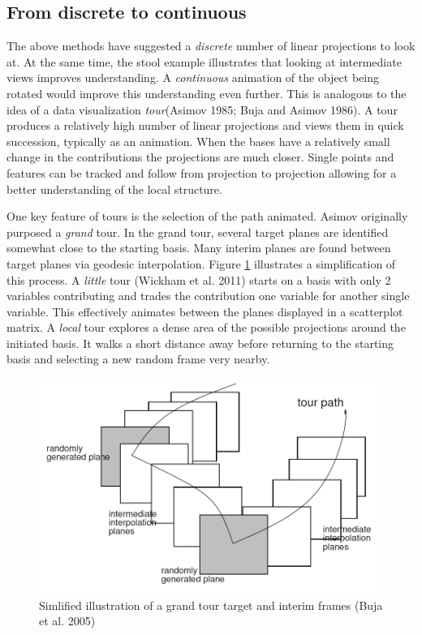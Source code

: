 \documentclass[11,]{article}
\begin{document}
\hypertarget{from-discrete-to-continuous}{%
\subsection{From discrete to continuous}\label{from-discrete-to-continuous}}

The above methods have suggested a \emph{discrete} number of linear projections to look at. At the same time, the stool example illustrates that looking at intermediate views improves understanding. A \emph{continuous} animation of the object being rotated would improve this understanding even further. This is analogous to the idea of a data visualization \emph{tour}(Asimov 1985; Buja and Asimov 1986). A tour produces a relatively high number of linear projections and views them in quick succession, typically as an animation. When the bases have a relatively small change in the contributions the projections are much closer. Single points and features can be tracked and follow from projection to projection allowing for a better understanding of the local structure.

One key feature of tours is the selection of the path animated.
Asimov originally purposed a \emph{grand} tour. In the grand tour, several target planes are identified somewhat close to the starting basis. Many interim planes are found between target planes via geodesic interpolation. Figure \ref{fig:grandFrames} illustrates a simplification of this process. A \emph{little} tour (Wickham et al. 2011) starts on a basis with only 2 variables contributing and trades the contribution one variable for another single variable. This effectively animates between the planes displayed in a scatterplot matrix. A \emph{local} tour explores a dense area of the possible projections around the initiated basis. It walks a short distance away before returning to the starting basis and selecting a new random frame very nearby.

\begin{figure}[h]

{\centering \includegraphics[width=0.8\linewidth,]{figures/buja05fig} 

}

\caption{Simlified illustration of a grand tour target and interim frames  (Buja et al. 2005)}\label{fig:grandFrames}
\end{figure}
\end{document}
